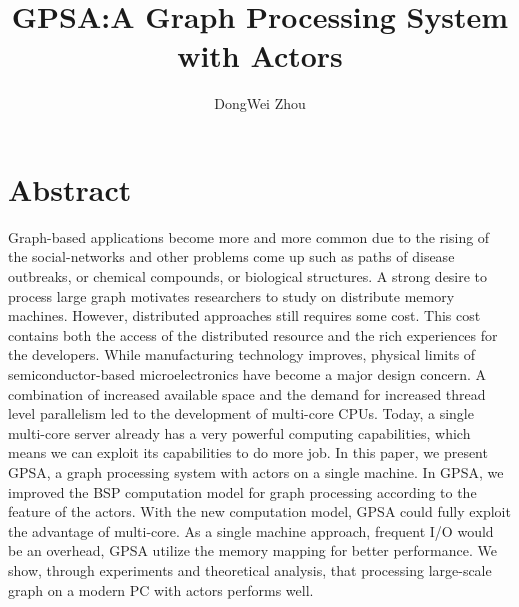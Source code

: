 \documentclass[twocolumn,a4paper,10pt]{article}
\author{DongWei Zhou}
\title{GPSA:A Graph Processing System with Actors}
\begin{document}
\maketitle
\section{Abstract}
Graph-based applications become more and more common due to the rising of the social-networks and other problems come up such as paths of disease outbreaks, or chemical compounds, or biological structures. A strong desire to process large graph motivates researchers to study on distribute memory machines. However, distributed approaches still requires some cost. This cost contains both the access of the distributed resource and the rich experiences for the developers. \newline
While manufacturing technology improves, physical limits of semiconductor-based microelectronics have become a major design concern. A combination of increased available space and the demand for increased thread level parallelism led to the development of multi-core CPUs. Today, a single multi-core server already has a very powerful computing capabilities, which means we can exploit its capabilities to do more job.\newline
In this paper, we present GPSA, a graph processing system with actors on a single machine. In GPSA, we improved the BSP computation model for graph processing according to the feature of the actors. With the new computation model, GPSA could fully exploit the advantage of  multi-core. As a single machine approach, frequent I/O would be an overhead, GPSA utilize the memory mapping for better performance. We show, through experiments and theoretical analysis, that processing large-scale graph on a modern PC with actors performs well.
\end{document}
